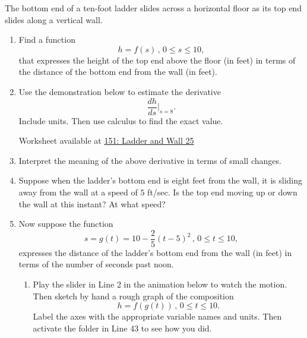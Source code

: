 \documentclass{ximera}
\begin{document}
\begin{question}  \label{QPERdgfret}
The bottom end of a ten-foot ladder slides across a horizontal floor as its top end slides along a vertical wall.

\begin{enumerate}
\item Find a function
\[
   h = f(s) \, , \, 0\leq s \leq 10 ,
\]
that expresses the height of the top end above the floor (in feet) in terms of the distance of the bottom end from the wall (in feet).

\item Use the demonstration below to estimate the derivative
\[
    \frac{dh}{ds}\Big|_{s=8}.
\]
Include units. Then use calculus to find the exact value.

\begin{onlineOnly}
    \begin{center}
\end{center}
\end{onlineOnly}

Worksheet available at \href{https://www.desmos.com/calculator/0r6g0avjbc}{151: Ladder and Wall 25} 

\item Interpret the meaning of the above derivative in terms of small changes.

\item Suppose when the ladder's bottom end is eight feet from the wall, it is sliding away from the wall at a speed of $5$ ft/sec. Is the top end moving up or down the wall at this instant? At what speed?

\item Now suppose the function
\[
    s = g(t)= 10-\frac{2}{5}(t-5)^2\, , \, 0\leq t \leq 10 ,
\]
expresses the distance of the ladder's bottom end from the wall (in feet) in terms of the number of seconds past noon.

\begin{enumerate}
\item Play the slider in Line 2 in the animation below to watch the motion. Then sketch by hand a rough graph of the composition
\[
     h = f(g(t)) \, , \, 0\leq t \leq 10.
\]
Label the axes with the appropriate variable names and units. Then activate the folder in Line 43 to see how you did.

\begin{onlineOnly}
    \begin{center}
\end{center}
\end{onlineOnly}


\end{enumerate}
\end{enumerate}
\end{question}
\end{document}
